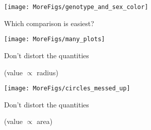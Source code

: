 \documentclass[12pt]{article}\usepackage[]{graphicx}\usepackage[]{color}
\makeatletter
\def\maxwidth{ %
  \ifdim\Gin@nat@width>\linewidth
    \linewidth
  \else
    \Gin@nat@width
  \fi
}
\newenvironment{knitrout}{}{} %
\newcommand{\headsize}{\fontsize{35}{35} \selectfont}
\newcommand{\smallsize}{\fontsize{25}{30} \selectfont}
\makeatother
\begin{document}
\vspace{10mm}

\begin{knitrout}
\color{fgcolor}

{\centering \texttt{[image: MoreFigs/genotype\_and\_sex\_color]} 

}



\end{knitrout}




\newpage


\headsize \color{myyellow}
\hfill
\begin{minipage}{6.75in}
\centering
Which comparison is easiest?
\end{minipage}

\vfill

\begin{knitrout}
\color{fgcolor}

{\centering \texttt{[image: MoreFigs/many\_plots]} 

}



\end{knitrout}




\newpage


\headsize \color{myyellow}
\hfill
\begin{minipage}{6.25in}
\centering
Don't distort the quantities

\color{myblue} \smallsize
(value $\propto$ {\color{mypink} radius})
\end{minipage}

\vfill

\begin{knitrout}
\color{fgcolor}

{\centering \texttt{[image: MoreFigs/circles\_messed\_up]} 

}



\end{knitrout}


\newpage


\headsize \color{myyellow}
\hfill
\begin{minipage}{6.25in}
\centering
Don't distort the quantities

\color{myblue} \smallsize
(value $\propto$ area)
\end{minipage}
\end{document}
